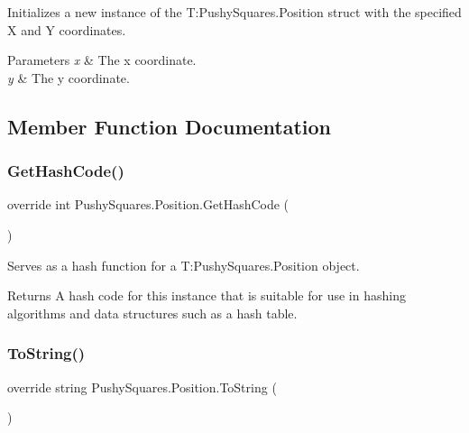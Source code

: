 Initializes a new instance of the T\+:\+Pushy\+Squares.\+Position struct with the specified X and Y coordinates. 


\begin{DoxyParams}{Parameters}
{\em x} & The x coordinate.\\
\hline
{\em y} & The y coordinate.\\
\hline
\end{DoxyParams}


\subsection{Member Function Documentation}
\mbox{\label{struct_pushy_squares_1_1_position_a2fbae2e4cc691860b1a475fd26450a4f}} 
\subsubsection{\texorpdfstring{Get\+Hash\+Code()}{GetHashCode()}}
{\footnotesize\ttfamily override int Pushy\+Squares.\+Position.\+Get\+Hash\+Code (\begin{DoxyParamCaption}{ }\end{DoxyParamCaption})}



Serves as a hash function for a T\+:\+Pushy\+Squares.\+Position object. 

\begin{DoxyReturn}{Returns}
A hash code for this instance that is suitable for use in hashing algorithms and data structures such as a hash table.
\end{DoxyReturn}
\mbox{\label{struct_pushy_squares_1_1_position_a2fa50254501b818be657fe8a0bf9d148}} 
\subsubsection{\texorpdfstring{To\+String()}{ToString()}}
{\footnotesize\ttfamily override string Pushy\+Squares.\+Position.\+To\+String (\begin{DoxyParamCaption}{ }\end{DoxyParamCaption})}



